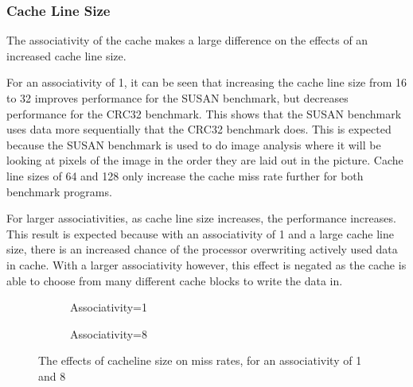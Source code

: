 \subsubsection{Cache Line Size}

The associativity of the cache makes a large difference on the effects of an increased cache
line size.

For an associativity of 1, it can be seen that increasing the cache line size from 16 to 32
improves performance for the SUSAN benchmark, but decreases performance for the CRC32
benchmark.
This shows that the SUSAN benchmark uses data more sequentially that the CRC32 benchmark
does.
This is expected because the SUSAN benchmark is used to do image analysis where it will be
looking at pixels of the image in the order they are laid out in the picture.
Cache line sizes of 64 and 128 only increase the cache miss rate further for
both benchmark programs.

For larger associativities, as cache line size increases, the performance increases.
This result is expected because with an associativity of 1 and a large cache line size, 
there is an increased chance of the processor overwriting actively used data in cache.
With a larger associativity however, this effect is negated as the cache is able to choose 
from many different cache blocks to write the data in.

\begin{figure}[H]%
\hfill%
\begin{subfigure}{.4\textwidth}
    \centering
    
    \caption{Associativity=1}
    \label{fig:partb-2d1}
\end{subfigure}%
\hfill%
\begin{subfigure}{.4\textwidth}
    \centering
    
    \caption{Associativity=8}
    \label{fig:partb-2d8}
\end{subfigure}%
\hfill\null%
\caption{The effects of cacheline size on miss rates, for an associativity of 1 and 8}
\end{figure}
